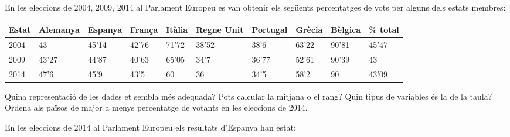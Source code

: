 \begin{mylist}

\vso
 \exer En les eleccions de 2004, 2009, 2014 al Parlament Europeu es van obtenir els següents percentatges de vots per alguns dels estats membres: 

\begin{longtable}{|p{0.4in}|p{0.6in}|p{0.5in}|p{0.4in}|p{0.4in}|p{0.4in}|p{0.5in}|p{0.4in}|p{0.5in}|p{0.5in}|} \hline 
Estat & Alemanya & Espanya & França & Itàlia & Regne Unit & Portugal & Grècia & Bèlgica & \% total \\ \hline 
2004 & 43 & 45'14 & 42'76 & 71'72 & 38'52 & 38'6 & 63'22 & 90'81 & 45'47 \\ \hline 
2009 & 43'27 & 44'87 & 40'63 & 65'05 & 34'7 & 36'77 & 52'61 & 90'39 & 43 \\ \hline 
2014 & 47'6 & 45'9 & 43'5 & 60 & 36 & 34'5 & 58'2 & 90 & 43'09 \\ \hline 
\end{longtable}

Quina representació de les dades et sembla més adequada? Pots calcular la mitjana o el rang? Quin tipus de variables és la de la taula? Ordena als països de major a menys percentatge de votants en les eleccions de 2014.
\vso
{}

\exer  En les eleccions de 2014 al Parlament Europeu els resultats d'Espanya han estat: 


\end{mylist}

